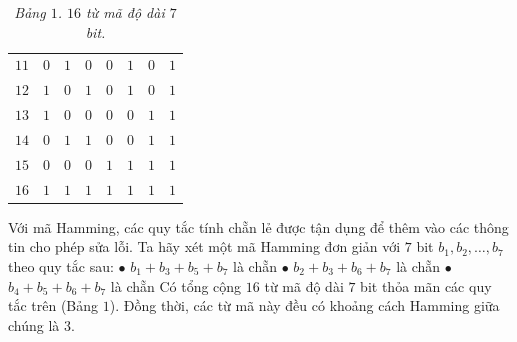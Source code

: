 \begin{multicols}{2}
\begin{table}[H]
\begin{tabular}{c c c c c c c c}
			$11$ &$0$&$1$&$0$&$0$&$1$&$0$&$1$\\
			$12$ &$1$&$0$&$1$&$0$&$1$&$0$&$1$\\
			$13$ &$1$&$0$&$0$&$0$&$0$&$1$&$1$\\
			$14$ &$0$&$1$&$1$&$0$&$0$&$1$&$1$\\
			$15$ &$0$&$0$&$0$&$1$&$1$&$1$&$1$\\
			$16$ &$1$&$1$&$1$&$1$&$1$&$1$&$1$\\
			\hline
		\end{tabular}	
		\caption{\small\textit{\color{toanhocdoisong}Bảng $1$. $16$ từ mã độ dài $7$ bit.}}
		\vspace*{-10pt}
	\end{table}
	Với mã Hamming, các quy tắc tính chẵn lẻ được tận dụng để thêm vào các thông tin cho phép sửa lỗi. Ta hãy xét một mã Hamming đơn giản với $7$ bit $b_1,b_2,\ldots,b_7$ theo quy tắc sau:
	\vskip 0.05cm
	$\bullet$ $b_1+b_3+b_5+b_7$ là chẵn
	\vskip 0.05cm
	$\bullet$ $b_2+b_3+b_6+b_7$ là chẵn
	\vskip 0.05cm
	$\bullet$ $b_4+b_5+b_6+b_7$ là chẵn
	\vskip 0.05cm
	Có tổng cộng $16$ từ mã độ dài $7$ bit thỏa mãn các quy tắc trên (Bảng $1$). Đồng thời, các từ mã này đều có khoảng cách Hamming giữa chúng là $3$.
	

\end{multicols}

